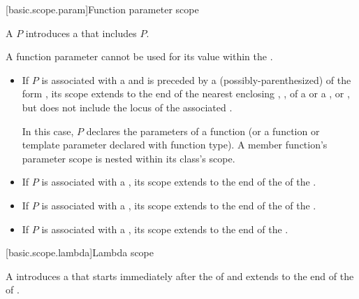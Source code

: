 [basic.scope.param]{Function parameter scope}

%
%

\pnum
A  $P$ introduces
a  that includes $P$.
\begin{note}
A function parameter cannot be used for its value
within the .
\end{note}
\begin{itemize}
\item
If $P$ is associated with a  and
is preceded by a (possibly-parenthesized)  of
the form
 ,
its scope extends to the end of the nearest enclosing
,
,
 of a  or
a , or
,
but does not include the locus of the associated .
\begin{note}
In this case, $P$ declares the parameters of a function
(or a function or template parameter declared with function type).
A member function's parameter scope is nested within its class's scope.
\end{note}
\item
If $P$ is associated with a ,
its scope extends to the end of the 
of the .
\item
If $P$ is associated with a ,
its scope extends to the end of the  of the .
\item
If $P$ is associated with a ,
its scope extends to the end of the .
\end{itemize}

[basic.scope.lambda]{Lambda scope}

A   introduces a 
that starts immediately after the  of 
and extends to the end of the  of .

